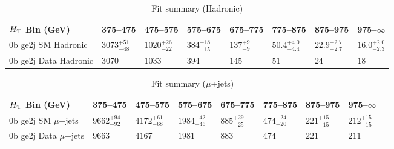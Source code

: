 \documentclass[8pt]{article}
\def\scalht{\mbox{$H_{\rm{T}}$}\xspace}
\newcommand\T{\rule{0pt}{2.6ex}}
\begin{document}
\begin{table}[ht!]
\caption{Fit summary (Hadronic)}
\label{tab:ensemble-summary}
\centering
\begin{tabular}{ llllllll }

\hline
\scalht Bin (GeV)       & 375--475                       & 475--575                       & 575--675                       & 675--775                       & 775--875                       & 875--975                       & 975--$\infty$                  \\ [1.000000ex]
\hline
0b ge2j SM Hadronic\T   & $3073^{+51}_{-48}$             & $1020^{+26}_{-22}$             & $384^{+18}_{-15}$              & $137^{+9}_{-9}$                & $50.4^{+4.0}_{-4.4}$           & $22.9^{+2.7}_{-2.7}$           & $16.0^{+2.0}_{-2.3}$           \\ 
0b ge2j Data Hadronic\T & $3070$                         & $1033$                         & $394$                          & $145$                          & $51$                           & $24$                           & $18$                           \\ 
\hline

\end{tabular}
\end{table}
\begin{table}[ht!]
\caption{Fit summary ($\mu$+jets)}
\label{tab:ensemble-summary}
\centering
\begin{tabular}{ llllllll }

\hline
\scalht Bin (GeV)       & 375--475                       & 475--575                       & 575--675                       & 675--775                       & 775--875                       & 875--975                       & 975--$\infty$                  \\ [1.000000ex]
\hline
0b ge2j SM $\mu$+jets\T & $9662^{+94}_{-92}$             & $4172^{+61}_{-68}$             & $1984^{+42}_{-46}$             & $885^{+29}_{-25}$              & $474^{+24}_{-20}$              & $221^{+15}_{-15}$              & $212^{+15}_{-15}$              \\ 
0b ge2j Data $\mu$+jets\T & $9663$                         & $4167$                         & $1981$                         & $883$                          & $474$                          & $221$                          & $211$                          \\ 
\hline

\end{tabular}
\end{table}
\end{document}
